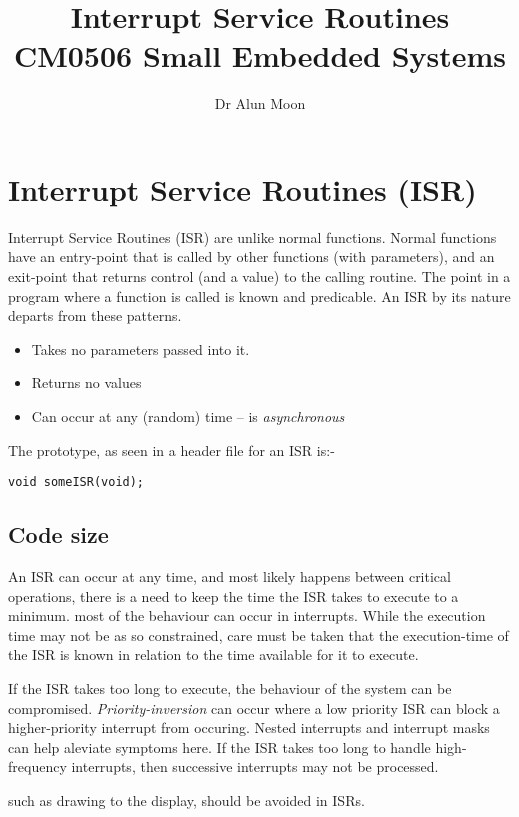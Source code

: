\documentclass[12pt]{tufte-handout}
\title{Interrupt Service Routines\\\small{CM0506 Small Embedded Systems}}
\author{Dr Alun Moon}
\begin{document}
\maketitle
\section{Interrupt Service Routines (ISR)}
{Interrupt Service Routines (ISR) are unlike normal
  functions.}  Normal functions have an entry-point that is called by
other functions (with parameters), and an exit-point that returns
control (and a value) to the calling routine.  The point in a program
where a function is called is known and predicable.
An ISR by its nature departs from these patterns.
\begin{itemize}
\item Takes no parameters passed into it.
\item Returns no values
\item Can occur at any (random) time -- is \emph{asynchronous}
\end{itemize}
The prototype, as seen in a header file for an ISR is:-
\begin{verbatim}
void someISR(void);
\end{verbatim}
\subsection{Code size}
An ISR can occur at any time, and most likely happens between critical
operations, there is a need to keep the time the ISR takes
to execute to a minimum.
 most of the behaviour can occur
in interrupts.  While the execution time may not be as so constrained,
care must be taken that the execution-time of the ISR is known in
relation to the time available for it to execute.

If the ISR takes too long to execute, the behaviour of the system can
be compromised.  \emph{Priority-inversion} can occur where a low
priority ISR can block a higher-priority interrupt from occuring.
Nested interrupts and interrupt masks can help aleviate symptoms here.  
If the ISR takes too long to handle high-frequency interrupts, then
successive interrupts may not be processed.  

 such as drawing to the
display, should be avoided in ISRs.
  
\end{document}
